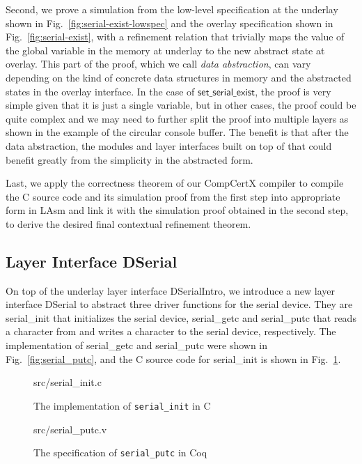 Second, we prove a simulation from the low-level specification at the underlay shown
in Fig.~\ref{fig:serial-exist-lowspec} and the overlay specification shown in
Fig.~\ref{fig:serial-exist}, with a refinement relation that trivially maps the
value of the global variable in the memory at underlay to the new abstract state
at overlay. This part of the proof, which we call {\em data abstraction}, can
vary depending on the kind of concrete data structures in memory and the
abstracted states in the overlay interface. In the case of
$\textsf{set\_serial\_exist}$, the proof is very simple given that it is just a
single variable, but in other cases, the proof could be quite complex and we
may need to further split the proof into multiple layers as shown in the example
of the circular console buffer. The benefit is that after the data abstraction,
the modules and layer interfaces built on top of that could benefit greatly from
the simplicity in the abstracted form.

Last, we apply the correctness theorem of our CompCertX compiler to compile the
C source code and its simulation proof from the first step into appropriate form
in LAsm and link it with the simulation proof obtained in the second step, to
derive the desired final contextual refinement theorem. 

\subsection{Layer Interface DSerial}

On top of the underlay layer interface DSerialIntro, we introduce a new layer
interface DSerial to abstract three driver functions for the serial device. They
are \textsf{serial\_init} that initializes the serial device,
\textsf{serial\_getc} and \textsf{serial\_putc} that reads a character from and
writes a character to the serial device, respectively. The implementation of
\textsf{serial\_getc} and \textsf{serial\_putc} were shown in
Fig.~\ref{fig:serial_putc}, and the C source code for \textsf{serial\_init} is
shown in Fig.~\ref{fig:serial_init_c}.

\begin{figure}
	 {src/serial_init.c}
	\caption{The implementation of \texttt{serial\_init} in C}
	\label{fig:serial_init_c}
\end{figure}

\begin{figure}
	 {src/serial_putc.v}
	\caption{The specification of \texttt{serial\_putc} in Coq}
	\label{fig:serial_putc_v}
\end{figure}

